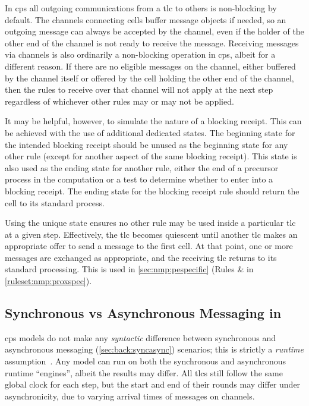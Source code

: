 In \gls{cps} all outgoing communications from a \gls{tlc} to others is non-blocking by default.  The channels connecting cells buffer message objects if needed, so an outgoing message can always be accepted by the channel, even if the holder of the other end of the channel is not ready to receive the message.  Receiving messages via channels is also ordinarily a non-blocking operation in \gls{cps}, albeit for a different reason.  If there are no eligible messages on the channel, either buffered by the channel itself or offered by the cell holding the other end of the channel, then the rules to receive over that channel will not apply at the next step regardless of whichever other rules may or may not be applied.

It may be helpful, however, to simulate the nature of a blocking receipt.  This can be achieved with the use of additional dedicated states.  The beginning state for the intended blocking receipt should be unused as the beginning state for any other rule (except for another aspect of the same blocking receipt).  This state is also used as the ending state for another rule, either the end of a precursor process in the computation or a test to determine whether to enter into a blocking receipt.  The ending state for the blocking receipt rule should return the cell to its standard process.

Using the unique state ensures no other rule may be used inside a particular \gls{tlc} at a given step.  Effectively, the \gls{tlc} becomes quiescent until another \gls{tlc} makes an appropriate offer to send a message to the first cell.  At that point, one or more messages are exchanged as appropriate, and the receiving \gls{tlc} returns to its standard processing.  This is used \eg{} in \cref{sec:nmp:pespecific} (Rules  \&  in \vref{ruleset:nmp:proxspec}).


\subsection{\label{sec:cps:syncasync}Synchronous vs Asynchronous Messaging in }

\gls{cps} models do not make any \emph{syntactic} difference between synchronous and asynchronous messaging (\cref{sec:back:syncasync}) scenarios;
this is strictly a \emph{runtime} assumption~\cite{Nicolescu2012}.
Any model can run on both the synchronous and asynchronous runtime ``engines'', albeit the results may differ.  All \glspl{tlc} still follow the same global clock for each step, but the start and end of their rounds may differ under asynchronicity, due to varying arrival times of messages on channels.

